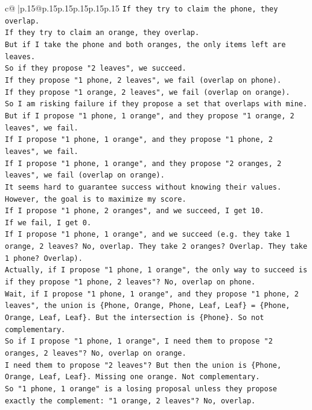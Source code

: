 \documentclass{article}
\begin{document}
{\begin{supertabular}{c@{$\;$}|p{.15\linewidth}@{}p{.15\linewidth}p{.15\linewidth}p{.15\linewidth}p{.15\linewidth}p{.15\linewidth}}
{{{\texttt{If they try to claim the phone, they overlap.} \\
\texttt{If they try to claim an orange, they overlap.} \\
\texttt{But if I take the phone and both oranges, the only items left are leaves.} \\
\texttt{So if they propose "2 leaves", we succeed.} \\
\texttt{If they propose "1 phone, 2 leaves", we fail (overlap on phone).} \\
\texttt{If they propose "1 orange, 2 leaves", we fail (overlap on orange).} \\
\texttt{So I am risking failure if they propose a set that overlaps with mine.} \\
\texttt{But if I propose "1 phone, 1 orange", and they propose "1 orange, 2 leaves", we fail.} \\
\texttt{If I propose "1 phone, 1 orange", and they propose "1 phone, 2 leaves", we fail.} \\
\texttt{If I propose "1 phone, 1 orange", and they propose "2 oranges, 2 leaves", we fail (overlap on orange).} \\
\texttt{It seems hard to guarantee success without knowing their values.} \\
\texttt{However, the goal is to maximize my score.} \\
\texttt{If I propose "1 phone, 2 oranges", and we succeed, I get 10.} \\
\texttt{If we fail, I get 0.} \\
\texttt{If I propose "1 phone, 1 orange", and we succeed (e.g. they take 1 orange, 2 leaves? No, overlap. They take 2 oranges? Overlap. They take 1 phone? Overlap).} \\
\texttt{Actually, if I propose "1 phone, 1 orange", the only way to succeed is if they propose "1 phone, 2 leaves"? No, overlap on phone.} \\
\texttt{Wait, if I propose "1 phone, 1 orange", and they propose "1 phone, 2 leaves", the union is \{Phone, Orange, Phone, Leaf, Leaf\} = \{Phone, Orange, Leaf, Leaf\}. But the intersection is \{Phone\}. So not complementary.} \\
\texttt{So if I propose "1 phone, 1 orange", I need them to propose "2 oranges, 2 leaves"? No, overlap on orange.} \\
\texttt{I need them to propose "2 leaves"? But then the union is \{Phone, Orange, Leaf, Leaf\}. Missing one orange. Not complementary.} \\
\texttt{So "1 phone, 1 orange" is a losing proposal unless they propose exactly the complement: "1 orange, 2 leaves"? No, overlap.} \\
}}}
\end{supertabular}}
\end{document}
